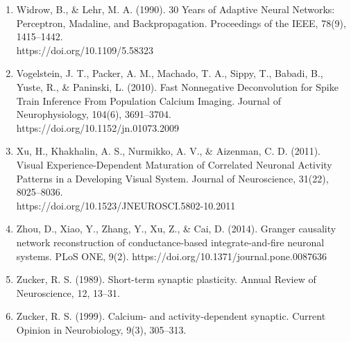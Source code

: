 \documentclass[11pt,titlepage]{article}
\begin{document}
\begin{spacing}{1}
\begin{enumerate}
\item Widrow, B., \& Lehr, M. A. (1990). 30 Years of Adaptive Neural Networks: Perceptron, Madaline, and Backpropagation. Proceedings of the IEEE, 78(9), 1415–1442.\\https://doi.org/10.1109/5.58323
\item Vogelstein, J. T., Packer, A. M., Machado, T. A., Sippy, T., Babadi, B., Yuste, R., \& Paninski, L. (2010). Fast Nonnegative Deconvolution for Spike Train Inference From Population Calcium Imaging. Journal of Neurophysiology, 104(6), 3691–3704.\\ https://doi.org/10.1152/jn.01073.2009
\item Xu, H., Khakhalin, A. S., Nurmikko, A. V., \& Aizenman, C. D. (2011). Visual Experience-Dependent Maturation of Correlated Neuronal Activity Patterns in a Developing Visual System. Journal of Neuroscience, 31(22), 8025–8036.\\ https://doi.org/10.1523/JNEUROSCI.5802-10.2011
\item Zhou, D., Xiao, Y., Zhang, Y., Xu, Z., \& Cai, D. (2014). Granger causality network reconstruction of conductance-based integrate-and-fire neuronal systems. PLoS ONE, 9(2). https://doi.org/10.1371/journal.pone.0087636
\item Zucker, R. S. (1989). Short-term synaptic plasticity. Annual Review of Neuroscience, 12, 13–31.
\item Zucker, R. S. (1999). Calcium- and activity-dependent synaptic. Current Opinion in Neurobiology, 9(3), 305–313.
\end{enumerate}
\end{spacing}
\end{document}
